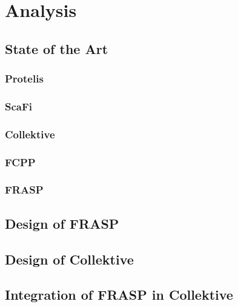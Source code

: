 \chapter{Analysis}
\label{chap:analysis}
\section{State of the Art}

\subsection{Protelis}

\subsection{ScaFi}

\subsection{Collektive}

\subsection{FCPP}

\subsection{FRASP}

\section{Design of FRASP}


\section{Design of Collektive}


\section{Integration of FRASP in Collektive}